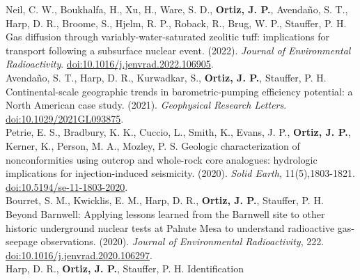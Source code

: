 \documentclass[11pt, letterpaper]{article}
\newcommand{\years}[1]{\marginnote{\scriptsize #1}}
\begin{document}
%
\hypersetup{linkcolor=black,citecolor=blue,filecolor=black,urlcolor=black} 
\years{2022}Neil, C. W., Boukhalfa, H., Xu, H., Ware, S. D., \textbf{Ortiz, J.
P.}, Avendaño, S. T., Harp, D. R., Broome, S., Hjelm, R. P., Roback, R., Brug,
W. P., Stauffer, P. H. Gas diffusion through variably-water-saturated zeolitic
tuff: implications for transport following a subsurface nuclear event. (2022).
\emph{Journal of Environmental Radioactivity}.
\href{https://www.sciencedirect.com/science/article/pii/S0265931X22000959/pdfft?md5=9a2aafb80eab7a1daa481601c5af9247&pid=1-s2.0-S0265931X22000959-main.pdf}{doi:10.1016/j.jenvrad.2022.106905}.
\JournalofenvironmentOOOOGasdiffusionthroughv\\
%
\years{2021}Avendaño, S. T., Harp, D. R., Kurwadkar, S., \textbf{Ortiz, J.
P.}, Stauffer, P. H. Continental-scale geographic trends in barometric-pumping
efficiency potential: a North American case study. (2021). 
\emph{Geophysical Research Letters}.  
\href{https://agupubs.onlinelibrary.wiley.com/doi/pdf/10.1029/2021GL093875}{doi:10.1029/2021GL093875}.
\GeophysicalresearchlOOOOContinentalScaleGeog\\
%
\years{2020}Petrie, E. S., Bradbury, K. K., Cuccio, L., Smith, K., Evans, J.
P., \textbf{Ortiz, J. P.}, Kerner, K., Person, M. A., Mozley, P. S.
Geologic characterization of nonconformities using outcrop and whole-rock core
analogues: hydrologic implications for injection-induced seismicity. (2020).
\emph{Solid Earth}, 11(5),1803-1821. 
\href{https://se.copernicus.org/articles/11/1803/2020/se-11-1803-2020.pdf}{doi:10.5194/se-11-1803-2020}.
\SolidEarthDiscussionOOOOGeologiccharacteriza\\
%
\years{2020}Bourret, S. M., Kwicklis, E. M., Harp, D. R., \textbf{Ortiz, J.
P.}, Stauffer, P. H. Beyond Barnwell: Applying lessons learned from the
Barnwell site to other historic underground nuclear tests at Pahute Mesa to
understand radioactive gas-seepage observations. (2020). \emph{Journal of Environmental
Radioactivity}, 222. 
\href{https://www.sciencedirect.com/science/article/pii/S0265931X20300199/pdfft?md5=63166f84895846446b3a9ce93cc68c79&pid=1-s2.0-S0265931X20300199-main.pdf}{doi:10.1016/j.jenvrad.2020.106297}.
\JournalofEnvironmentOOOOBeyondBarnwellApplyi\\
%
\years{2019}Harp, D. R., \textbf{Ortiz, J. P.}, Stauffer, P. H. Identification
\end{document}
